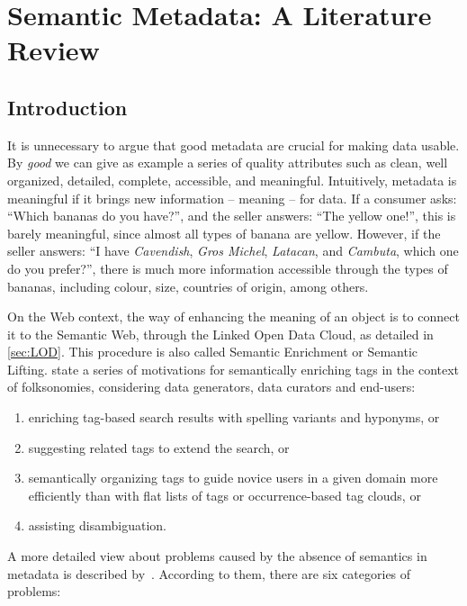 \section{Semantic Metadata: A Literature Review}
\label{sec:semantic_metadata}

\subsection{Introduction}

It is unnecessary to argue that good metadata are crucial for making data usable.
By \emph{good} we can give as example a series of quality attributes such as clean, well organized, detailed, complete, accessible, and meaningful.
Intuitively, metadata is meaningful if it brings new information -- meaning -- for data.
If a consumer asks: ``Which bananas do you have?'', and the seller answers: ``The yellow one!'', this is barely meaningful, since almost all types of banana are yellow.
However, if the seller answers: ``I have \emph{Cavendish}, \emph{Gros Michel}, \emph{Latacan}, and \emph{Cambuta}, which one do you prefer?'', there is much more information accessible through the types of bananas, including colour, size, countries of origin, among others.

On the Web context, the way of enhancing the meaning of an object is to connect it to the Semantic Web, through the Linked Open Data Cloud, as detailed in \autoref{sec:LOD}.
This procedure is also called Semantic Enrichment or Semantic Lifting.
 state a series of motivations for semantically enriching tags in the context of folksonomies, considering data generators, data curators and end-users:
\begin{enumerate}
	\item enriching tag-based search results with spelling variants and hyponyms, or 
	\item suggesting related tags to extend the search, or 
	\item semantically organizing tags to guide novice users in a given domain more efficiently than with flat lists of tags or occurrence-based tag clouds, or 
	\item assisting disambiguation.
\end{enumerate}

A more detailed view about problems caused by the absence of semantics in metadata is described by~.
According to them, there are six categories of problems:

